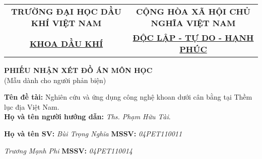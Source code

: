 \documentclass[12pt,a4paper]{article}
\begin{document}
\newpage
\begin{table}[h]
\centering
\label{my-label}
\begin{tabular}{cc}
 \textbf{TRƯỜNG ĐẠI HỌC DẦU KHÍ VIỆT NAM} & \textbf{CỘNG HÒA XÃ HỘI CHỦ NGHĨA VIỆT NAM} \\
 \underline{\textbf{KHOA DẦU KHÍ}}& \underline{\textbf{ĐỘC LẬP - TỰ DO - HẠNH PHÚC}}
\end{tabular}
\end{table}
\begin{center}
	\centering
	\textbf{PHIẾU NHẬN XÉT ĐỒ ÁN MÔN HỌC}\\
	(Mẫu dành cho người phản biện)
\end{center}
\textbf{Tên đề tài:} Nghiên cứu và ứng dụng công nghệ khoan dưới cân bằng tại Thềm lục địa Việt Nam.\\
\textbf{Họ và tên người hướng dẫn:} \textit{Ths. Phạm Hữu Tài}.

\textbf{Họ và tên SV:} \textit{Bùi Trọng Nghĩa} \hspace{98pt} \textbf{MSSV:} \textit{04PET110011} 

\hspace{68pt} \textit{Trương Mạnh Phi} \hspace{95pt} \textbf{MSSV:} \textit{04PET110014}
\end{document}
